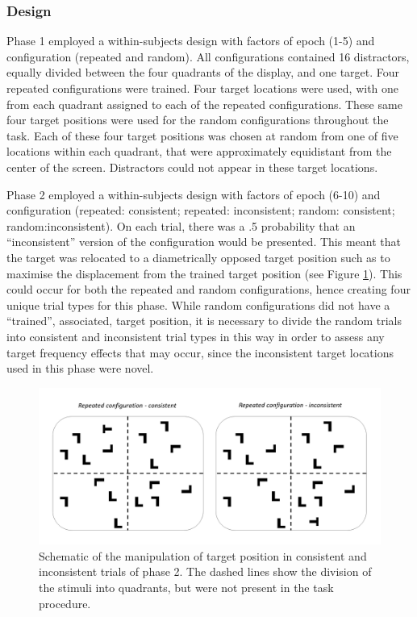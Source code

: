 \documentclass[
  man,floatsintext]{apa7}
\begin{document}
\hypertarget{design}{%
\subsubsection{Design}\label{design}}

Phase 1 employed a within-subjects design with factors of epoch (1-5) and configuration (repeated and random). All configurations contained 16 distractors, equally divided between the four quadrants of the display, and one target. Four repeated configurations were trained. Four target locations were used, with one from each quadrant assigned to each of the repeated configurations. These same four target positions were used for the random configurations throughout the task. Each of these four target positions was chosen at random from one of five locations within each quadrant, that were approximately equidistant from the center of the screen. Distractors could not appear in these target locations.

Phase 2 employed a within-subjects design with factors of epoch (6-10) and configuration (repeated: consistent; repeated: inconsistent; random: consistent; random:inconsistent). On each trial, there was a .5 probability that an ``inconsistent'' version of the configuration would be presented. This meant that the target was relocated to a diametrically opposed target position such as to maximise the displacement from the trained target position (see Figure \ref{fig:schematicCC}). This could occur for both the repeated and random configurations, hence creating four unique trial types for this phase. While random configurations did not have a ``trained'', associated, target position, it is necessary to divide the random trials into consistent and inconsistent trial types in this way in order to assess any target frequency effects that may occur, since the inconsistent target locations used in this phase were novel.



\begin{figure}

{\centering \includegraphics[width=0.75\linewidth]{Schematic} 

}

\caption{Schematic of the manipulation of target position in consistent and inconsistent trials of phase 2. The dashed lines show the division of the stimuli into quadrants, but were not present in the task procedure.}\label{fig:schematicCC}
\end{figure}
\end{document}
